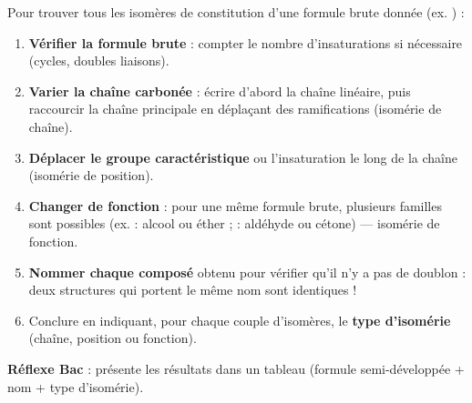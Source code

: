 \documentclass[11pt]{article}
\newcommand{\cle}[1]{{\popxbold\color{popdark}#1}}
\begin{document}
\begin{methode}
Pour trouver tous les isomères de constitution d'une formule brute donnée (ex. ) :
\begin{enumerate}
\item \textbf{Vérifier la formule brute} : compter le nombre d'insaturations si nécessaire (cycles, doubles liaisons).
\item \textbf{Varier la chaîne carbonée} : écrire d'abord la chaîne linéaire, puis raccourcir la chaîne principale en déplaçant des ramifications (isomérie de \cle{chaîne}).
\item \textbf{Déplacer le groupe caractéristique} ou l'insaturation le long de la chaîne (isomérie de \cle{position}).
\item \textbf{Changer de fonction} : pour une même formule brute, plusieurs familles sont possibles (ex.  : alcool ou éther ;  : aldéhyde ou cétone) — isomérie de \cle{fonction}.
\item \textbf{Nommer chaque composé} obtenu pour vérifier qu'il n'y a pas de doublon : deux structures qui portent le même nom sont identiques !
\item Conclure en indiquant, pour chaque couple d'isomères, le \textbf{type d'isomérie} (chaîne, position ou fonction).
\end{enumerate}
\textbf{Réflexe Bac} : présente les résultats dans un tableau (formule semi-développée + nom + type d'isomérie).
\end{methode}
\end{document}
